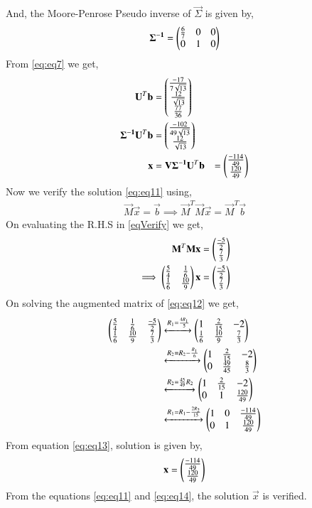 \documentclass[journal,12pt,twocolumn]{IEEEtran}
\begin{document}
And, the Moore-Penrose Pseudo inverse of $\vec{\Sigma}$ is given by,
\begin{align}
\mathbf{\Sigma^{-1}} = \begin{pmatrix}\frac{6}{7}&0&0\\0&1&0\end{pmatrix}
\end{align}
From \eqref{eq:eq7} we get,
\begin{align}
\mathbf{U}^T\mathbf{b}&=\begin{pmatrix}\frac{-17}{7\sqrt{13}}\\\frac{12}{\sqrt{13}}\\\frac{77}{36}\end{pmatrix}\\
\mathbf{\Sigma^{-1}}\mathbf{U}^T\mathbf{b}&=\begin{pmatrix}\frac{-102}{49\sqrt{13}}\\\frac{12}{\sqrt{13}}\end{pmatrix}\\
\mathbf{x} &= \mathbf{V}\mathbf{\Sigma^{-1}}\mathbf{U}^T\mathbf{b} &= \begin{pmatrix}\frac{-114}{49}\\\frac{120}{49}\end{pmatrix}\label{eq:eq11}
\end{align}
Now we verify the solution \eqref{eq:eq11} using,
\begin{align}
\vec{M}\vec{x}=\vec{b}
\implies\vec{M}^T\vec{M}\vec{x} = \vec{M}^T\vec{b}\label{eqVerify}
\end{align}
On evaluating the R.H.S in \eqref{eqVerify} we get,
\begin{align}
\mathbf{M}^T\mathbf{M}\mathbf{x} &= \begin{pmatrix}\frac{-5}{2}\\\frac{7}{3}\end{pmatrix}\\
\implies\begin{pmatrix}\frac{5}{4}&\frac{1}{6}\\\frac{1}{6}&\frac{10}{9}\end{pmatrix}\mathbf{x} &= \begin{pmatrix}\frac{-5}{2}\\\frac{7}{3}\end{pmatrix}\label{eq:eq12}
\end{align}
On solving the augmented matrix of \eqref{eq:eq12} we get,
\begin{align}
\begin{pmatrix}\frac{5}{4}&\frac{1}{6}&\frac{-5}{2}\\\frac{1}{6}&\frac{10}{9}&\frac{7}{3}\end{pmatrix} &\xleftrightarrow{R_1=\frac{4R_1}{5}}\begin{pmatrix}1&\frac{2}{15}&-2\\\frac{1}{6}&\frac{10}{9}&\frac{7}{3}\end{pmatrix}\\
&\xleftrightarrow{R_2=R_2-\frac{R_1}{6}}\begin{pmatrix}1&\frac{2}{15}&-2\\0&\frac{49}{45}&\frac{8}{3}\end{pmatrix}\\
&\xleftrightarrow{R_2=\frac{45}{49}R_2}\begin{pmatrix}1&\frac{2}{15}&-2\\0&1&\frac{120}{49}\end{pmatrix}\\
&\xleftrightarrow{R_1=R_1-\frac{2R_2}{15}}\begin{pmatrix}1&0&\frac{-114}{49}\\0&1&\frac{120}{49}\end{pmatrix}\label{eq:eq13}
\end{align}
From equation \eqref{eq:eq13}, solution is given by,
\begin{align}
\mathbf{x}=\begin{pmatrix}\frac{-114}{49}\\\frac{120}{49}\end{pmatrix}\label{eq:eq14}
\end{align}
From the equations \eqref{eq:eq11} and \eqref{eq:eq14}, the solution $\vec{x}$ is verified.
\\
\end{document}
